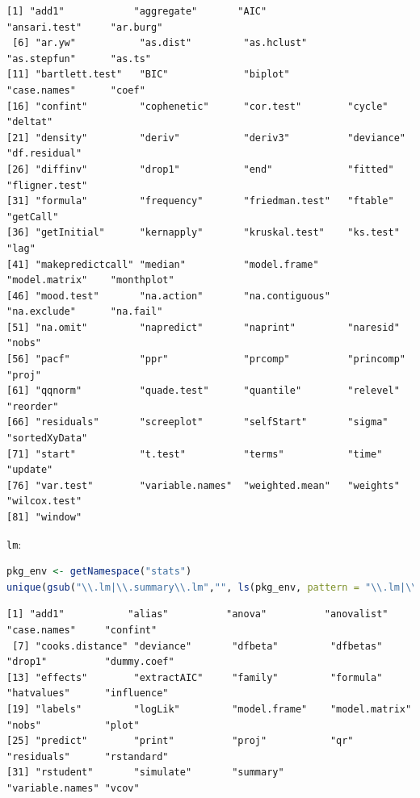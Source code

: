 \documentclass{article}
\begin{document}
\label{}
\begin{verbatim}
[1] "add1"            "aggregate"       "AIC"             "ansari.test"     "ar.burg"        
 [6] "ar.yw"           "as.dist"         "as.hclust"       "as.stepfun"      "as.ts"          
[11] "bartlett.test"   "BIC"             "biplot"          "case.names"      "coef"           
[16] "confint"         "cophenetic"      "cor.test"        "cycle"           "deltat"         
[21] "density"         "deriv"           "deriv3"          "deviance"        "df.residual"    
[26] "diffinv"         "drop1"           "end"             "fitted"          "fligner.test"   
[31] "formula"         "frequency"       "friedman.test"   "ftable"          "getCall"        
[36] "getInitial"      "kernapply"       "kruskal.test"    "ks.test"         "lag"            
[41] "makepredictcall" "median"          "model.frame"     "model.matrix"    "monthplot"      
[46] "mood.test"       "na.action"       "na.contiguous"   "na.exclude"      "na.fail"        
[51] "na.omit"         "napredict"       "naprint"         "naresid"         "nobs"           
[56] "pacf"            "ppr"             "prcomp"          "princomp"        "proj"           
[61] "qqnorm"          "quade.test"      "quantile"        "relevel"         "reorder"        
[66] "residuals"       "screeplot"       "selfStart"       "sigma"           "sortedXyData"   
[71] "start"           "t.test"          "terms"           "time"            "update"         
[76] "var.test"        "variable.names"  "weighted.mean"   "weights"         "wilcox.test"    
[81] "window"
\end{verbatim}

\texttt{lm}:
\begin{lstlisting}[language=r,numbers=none]
pkg_env <- getNamespace("stats")
unique(gsub("\\.lm|\\.summary\\.lm","", ls(pkg_env, pattern = "\\.lm|\\.summary\\.lm")))
\end{lstlisting}

\label{}
\begin{verbatim}
[1] "add1"           "alias"          "anova"          "anovalist"      "case.names"     "confint"       
 [7] "cooks.distance" "deviance"       "dfbeta"         "dfbetas"        "drop1"          "dummy.coef"    
[13] "effects"        "extractAIC"     "family"         "formula"        "hatvalues"      "influence"     
[19] "labels"         "logLik"         "model.frame"    "model.matrix"   "nobs"           "plot"          
[25] "predict"        "print"          "proj"           "qr"             "residuals"      "rstandard"     
[31] "rstudent"       "simulate"       "summary"        "variable.names" "vcov"
\end{verbatim}
\end{document}
